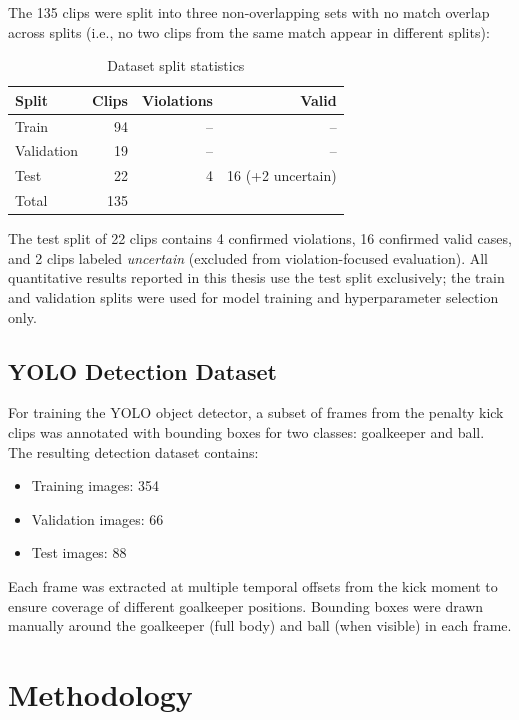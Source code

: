 \documentclass[12pt,a4paper,twoside]{article}
\begin{document}
The 135 clips were split into three non-overlapping sets with no match overlap
across splits (i.e., no two clips from the same match appear in different splits):

\begin{table}[H]
  \centering
  \caption{Dataset split statistics}
  \label{tab:splits}
  \begin{tabular}{lrrr}
    \toprule
    Split & Clips & Violations & Valid \\
    \midrule
    Train & 94 & -- & -- \\
    Validation & 19 & -- & -- \\
    Test & 22 & 4 & 16 (+2 uncertain) \\
    \midrule
    Total & 135 & & \\
    \bottomrule
  \end{tabular}
\end{table}

The test split of 22 clips contains 4 confirmed violations, 16 confirmed valid
cases, and 2 clips labeled \textit{uncertain} (excluded from violation-focused
evaluation). All quantitative results reported in this thesis use the test split
exclusively; the train and validation splits were used for model training and
hyperparameter selection only.

\subsection{YOLO Detection Dataset}

For training the YOLO object detector, a subset of frames from the penalty kick
clips was annotated with bounding boxes for two classes: goalkeeper and ball.
The resulting detection dataset contains:
\begin{itemize}
  \item Training images: 354
  \item Validation images: 66
  \item Test images: 88
\end{itemize}

Each frame was extracted at multiple temporal offsets from the kick moment to
ensure coverage of different goalkeeper positions. Bounding boxes were drawn
manually around the goalkeeper (full body) and ball (when visible) in each frame.


\section{Methodology}
\label{sec:method}
\end{document}
